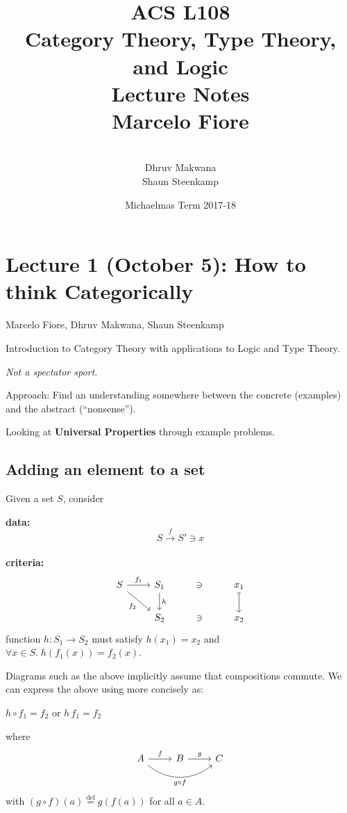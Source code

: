 \documentclass[a4paper, 12pt]{article}
\title{ACS L108\\
  Category Theory, Type Theory, and Logic\\
  Lecture Notes\\[4mm]
  \Large Marcelo Fiore}
\author{\mbox{}\\[-8mm]Dhruv Makwana\\ 
  Shaun Steenkamp}
\date{Michaelmas Term 2017-18}
\theoremstyle{definition}
\newcommand{\eqdef}{\stackrel{\text{def}}{=}} %
\newcommand{\comp}{\circ} %
\newcommand{\icomp}{\,} %
\begin{document}
\maketitle

\tableofcontents

\newpage
\section{Lecture 1 (October 5): How to think Categorically}
\vspace*{-5mm}\hspace*{7.75mm}
Marcelo Fiore, Dhruv Makwana, Shaun Steenkamp
\bigskip

Introduction to Category Theory with applications to Logic and Type Theory.

\emph{Not a spectator sport.}

Approach: Find an understanding somewhere between the concrete (examples) and
the abstract (``nonsense'').

Looking at \textbf{Universal Properties} through example problems.

\subsection{Adding an element to a set}

Given a set $S$, consider

\textbf{data:} $$ S \overset{f}{\rightarrow} S' \ni x $$ \\
\textbf{criteria:} $$
    \begin{tikzcd}
        S \arrow[r, "f_1"]
          \arrow[dr, swap, "f_2"]
          &
        S_1 \arrow[d, "h"] & \ni & x_1 \arrow[d, mapsto]
          \\
          {}&
        S_2 & \ni & x_2
    \end{tikzcd}
$$
\quad function $h : S_1 \rightarrow S_2$ must satisfy $h(x_1) = x_2$ and 
$\forall x \in S .\; h(f_1(x)) = f_2(x)$.

\begin{framed}
Diagrams such as the above implicitly assume that compositions commute.  We
can express the above using more concisely as:
\begin{center}
$h\comp f_1 = f_2$
\quad or \quad
$h\icomp f_1 = f_2$
\end{center}
where 
$$
\begin{tikzcd}
    A \arrow[r, "f"] \arrow[rr, swap, bend right=40, "g \circ f"] & B \arrow[r, "g"] & C
\end{tikzcd}
$$
with $(g\comp f)(a)\eqdef g(f(a))$ for all $a\in A$.
\end{framed}
\end{document}
